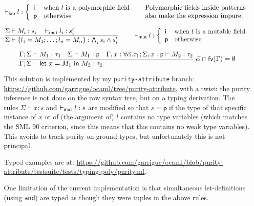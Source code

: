 \documentclass[a4paper]{article}
\let\th\vdash
\let\E\Sigma
\let\G\Gamma
\let\tv\alpha
\let\t\tau
\def\p{\mathsf{p}}
\def\i{\mathsf{i}}
\newcommand\lfrac[2]{\frac{#1\hfill}{#2\hfill}}
\newcommand\mlet[1]{\textsf{let}~#1~\textsf{in}~}
\begin{document}
\[
\th_{\sf lab} l :
\left\{\begin{array}{ll}
\i & \mbox{when $l$ is a polymorphic field} \\
\p & \mbox{otherwise} \\
\end{array}\right.
\quad
\begin{array}{l}
  \mbox{Polymorphic fields inside patterns} \\
  \mbox{also make the expression impure.}
\end{array}
\]

\[
\lfrac{\E \th M_i : s_i \quad \th_{\sf mut} l_i : s'_i}
{\E \th \{l_1 = M_1; \dots; l_n = M_n\} : \bigwedge_i s_i \land s'_i}
\hspace{5ex}
\th_{\sf mut} l :
\left\{\begin{array}{ll}
\i & \mbox{when $l$ is a mutable field} \\
\p & \mbox{otherwise} \\
\end{array}\right.
\]

\[
\lfrac{\G;\E \th M_1 : \t_1  \quad \E \th M_1 : \p \quad
  \G, x : \forall\vec\tv.\t_1; \E,x : \p \th M_2 : \t_2}
{\G;\E \th \mlet{x = M_1} M_2 : \t_2}~ \vec\tv \cap \textsf{fv}(\G) = \emptyset
\]

This solution is implemented by my {\tt purity-attribute} branch:
\url{https://github.com/garrigue/ocaml/tree/purity-attribute}, with a
twist: the purity inference is not done on the raw syntax tree, but on
a typing derivation. The rules $\E \th x : s$ and
$\th_{\sf mut} l : s$ are modified so that $s = \p$ if the type of
that specific instance of $x$ or of (the argument of) $l$ contains no
type variables (which matches the SML 90 criterion, since this means
that this contains no weak type variables). This avoids to track
purity on ground types, but unfortunately this is not principal.

Typed examples are at:
\url{https://github.com/garrigue/ocaml/blob/purity-attribute/testsuite/tests/typing-poly/purity.ml}.

One limitation of the current implementation is that simultaneous
let-definitions (using {\tt and}) are typed as though they were tuples
in the above rules.
\end{document}

